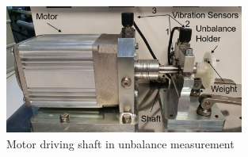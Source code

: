 


\begin{figure}[h]
\centering
\includegraphics[width=0.7\textwidth]{assets/rotating-shaft.jpg}
\caption{Motor driving shaft in unbalance measurement \cite{mey_machine_2020}}
\label{fig:rotating-shaft}
\end{figure}

\cite{mey_machine_2020}

